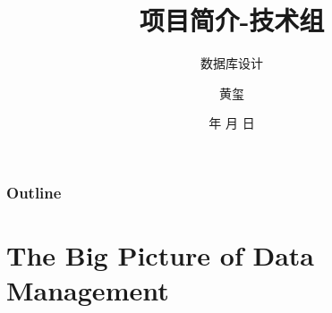\documentclass{beamer}
\begin{document}
\title{项目简介-技术组}
\subtitle{数据库设计}

\author{黄玺}


\renewcommand{\today}{\number\year 年 \number\month 月 \number\day 日}
\date{\today}

\subject{Presentations}

\begin{frame}
\titlepage
\end{frame}

\begin{frame}
\frametitle{Outline}
\tableofcontents
\end{frame}

\section{The Big Picture of Data Management}
\end{document}
